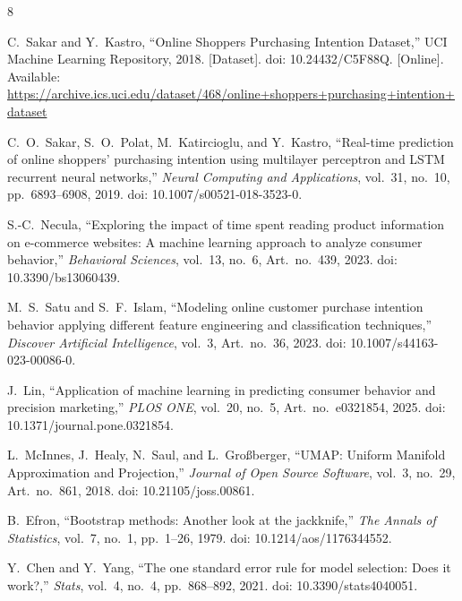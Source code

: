 \documentclass[journal]{IEEEtran}
\begin{document}
\begin{thebibliography}{8}

C.~Sakar and Y.~Kastro, ``Online Shoppers Purchasing Intention Dataset,'' UCI Machine
Learning Repository, 2018. [Dataset]. doi: 10.24432/C5F88Q. [Online]. Available:
\url{https://archive.ics.uci.edu/dataset/468/online+shoppers+purchasing+intention+dataset}

C.~O.~Sakar, S.~O.~Polat, M.~Katircioglu, and Y.~Kastro, ``Real-time prediction of
online shoppers' purchasing intention using multilayer perceptron and LSTM recurrent
neural networks,'' \textit{Neural Computing and Applications}, vol.~31, no.~10,
pp.~6893--6908, 2019. doi: 10.1007/s00521-018-3523-0.

S.-C.~Necula, ``Exploring the impact of time spent reading product information on
e-commerce websites: A machine learning approach to analyze consumer behavior,''
\textit{Behavioral Sciences}, vol.~13, no.~6, Art.~no.~439, 2023.
doi: 10.3390/bs13060439.

M.~S.~Satu and S.~F.~Islam, ``Modeling online customer purchase intention behavior
applying different feature engineering and classification techniques,''
\textit{Discover Artificial Intelligence}, vol.~3, Art.~no.~36, 2023.
doi: 10.1007/s44163-023-00086-0.

J.~Lin, ``Application of machine learning in predicting consumer behavior and
precision marketing,'' \textit{PLOS ONE}, vol.~20, no.~5, Art.~no.~e0321854, 2025.
doi: 10.1371/journal.pone.0321854.

L.~McInnes, J.~Healy, N.~Saul, and L.~Gro{\ss}berger, ``UMAP: Uniform Manifold
Approximation and Projection,'' \textit{Journal of Open Source Software}, vol.~3, no.~29,
Art.~no.~861, 2018. doi: 10.21105/joss.00861.

B.~Efron, ``Bootstrap methods: Another look at the jackknife,'' \textit{The Annals of
Statistics}, vol.~7, no.~1, pp.~1--26, 1979. doi: 10.1214/aos/1176344552.

Y.~Chen and Y.~Yang, ``The one standard error rule for model selection: Does it work?,''
\textit{Stats}, vol.~4, no.~4, pp.~868--892, 2021. doi: 10.3390/stats4040051.

\end{thebibliography}
\end{document}
